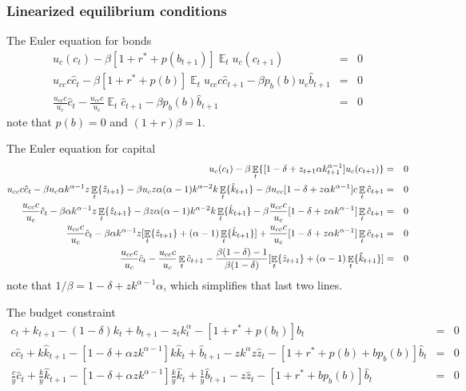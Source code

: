 \documentclass[11pt,pdftex,twoside,letterpaper]{exam}
\DeclareMathOperator{\EX}{\mathbb{E}}%
\begin{document}
\subsubsection{Linearized equilibrium conditions}
The Euler equation for bonds
\begin{eqnarray}
  u_c(c_t)-\beta[1+r^*+p(b_{t+1})]\EX_tu_c(c_{t+1}) &=& 0\\
  u_{cc}c\hat{c}_t-\beta[1+r^*+p(b)]\EX_tu_{cc}c\hat{c}_{t+1}-\beta p_b(b)u_{c} \hat{b}_{t+1} &=& 0\\
  \frac{u_{cc}c}{u_c}\hat{c}_t-\frac{u_{cc}c}{u_c}\EX_t\hat{c}_{t+1}-\beta p_b(b) \hat{b}_{t+1} &=& 0
\end{eqnarray}
note that $p(b)=0$ and $(1+r)\beta=1$.

The Euler equation for capital
\begin{eqnarray}
  u_c(c_t)-\beta\EX_t\{[1-\delta +z_{t+1}\alpha k_{t+1}^{\alpha-1}] u_c(c_{t+1})\} &=& 0 \notag\\
  u_{cc}c\hat{c}_t-\beta u_c\alpha k^{\alpha-1}z\EX_t\{\hat{z}_{t+1}\}  -\beta u_c z \alpha (\alpha-1)k^{\alpha-2}k \EX_t\{\hat{k}_{t+1}\}  -\beta u_{cc}[1-\delta +z\alpha k^{\alpha-1}]c \EX_t\hat{c}_{t+1} &=& 0 \notag\\
  \frac{u_{cc}c}{u_c}\hat{c}_t-\beta \alpha k^{\alpha-1}z\EX_t\{\hat{z}_{t+1}\}  -\beta z \alpha (\alpha-1)k^{\alpha-2}k \EX_t\{\hat{k}_{t+1}\}  -\beta \frac{u_{cc}c}{u_c}[1-\delta +z\alpha k^{\alpha-1}] \EX_t\hat{c}_{t+1} &=& 0 \notag\\
  \frac{u_{cc}c}{u_c}\hat{c}_t - \beta \alpha k^{\alpha-1}z [ \EX_t\{\hat{z}_{t+1}\}  + (\alpha-1)\EX_t\{\hat{k}_{t+1}\}] +  \frac{u_{cc}c}{u_c}[1-\delta +z\alpha k^{\alpha-1}] \EX_t\hat{c}_{t+1} &=& 0 \notag\\
  \frac{u_{cc}c}{u_c}\hat{c}_t-  \frac{u_{cc}c}{u_c} \EX_t\hat{c}_{t+1} - \frac{\beta(1-\delta)-1}{\beta(1-\delta)} [ \EX_t\{\hat{z}_{t+1}\}  + (\alpha-1)\EX_t\{\hat{k}_{t+1}\}]  &=& 0 \notag
\end{eqnarray}
note that $1/\beta = 1-\delta+zk^{\alpha-1}\alpha$, which simplifies that last two lines.

The budget constraint
\begin{eqnarray}
  c_t+k_{t+1}-(1-\delta)k_t+b_{t+1}-z_tk_t^{\alpha}-[1+r^*+p(b_{t})]b_t &=& 0\\
  c\hat{c}_t+k\hat{k}_{t+1} - [1-\delta+\alpha z k^{\alpha-1}] k \hat{k}_t + \hat{b}_{t+1} -zk^{\alpha}z\hat{z}_t -[1+r^*+p(b)+bp_b(b)]\hat{b}_t &=& 0\\
  \frac{c}{y}\hat{c}_t+\frac{k}{y}\hat{k}_{t+1} - [1-\delta+\alpha z k^{\alpha-1}] \frac{k}{y} \hat{k}_t + \frac{1}{y}\hat{b}_{t+1} -z\hat{z}_t -[1+r^*+bp_b(b)]\hat{b}_t &=& 0
\end{eqnarray}
\end{document}
